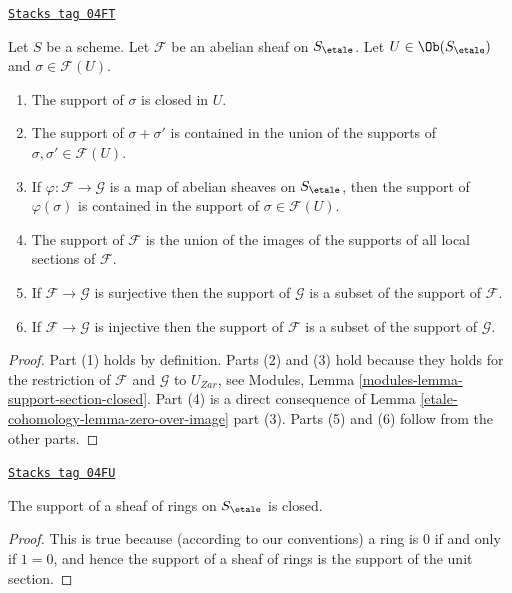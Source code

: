 \begin{lemma}
\label{etale-cohomology-lemma-support-section-closed}
\href{https://stacks.math.columbia.edu/tag/04FT}{\texttt{Stacks tag 04FT}}

Let $S$ be a scheme.
Let $\mathcal{F}$ be an abelian sheaf on $S_\etale$.
Let $U \in \Ob(S_\etale)$ and $\sigma \in \mathcal{F}(U)$.
\begin{enumerate}
\item The support of $\sigma$ is closed in $U$.
\item The support of $\sigma + \sigma'$ is contained in the union of
the supports of $\sigma, \sigma' \in \mathcal{F}(U)$.
\item If $\varphi : \mathcal{F} \to \mathcal{G}$ is a map of
abelian sheaves on $S_\etale$, then the support of $\varphi(\sigma)$
is contained in the support of $\sigma \in \mathcal{F}(U)$.
\item The support of $\mathcal{F}$ is the union of the images of the
supports of all local sections of $\mathcal{F}$.
\item If $\mathcal{F} \to \mathcal{G}$ is surjective then the support
of $\mathcal{G}$ is a subset of the support of $\mathcal{F}$.
\item If $\mathcal{F} \to \mathcal{G}$ is injective then the support
of $\mathcal{F}$ is a subset of the support of $\mathcal{G}$.
\end{enumerate}
\end{lemma}

\begin{proof}
Part (1) holds by definition.
Parts (2) and (3) hold because they holds for the restriction of
$\mathcal{F}$ and $\mathcal{G}$ to $U_{Zar}$, see
Modules, Lemma \ref{modules-lemma-support-section-closed}.
Part (4) is a direct consequence of
Lemma \ref{etale-cohomology-lemma-zero-over-image} part (3).
Parts (5) and (6) follow from the other parts.
\end{proof}

\begin{lemma}
\label{etale-cohomology-lemma-support-sheaf-rings-closed}
\href{https://stacks.math.columbia.edu/tag/04FU}{\texttt{Stacks tag 04FU}}

The support of a sheaf of rings on $S_\etale$ is closed.
\end{lemma}

\begin{proof}
This is true because (according to our conventions)
a ring is $0$ if and only if
$1 = 0$, and hence the support of a sheaf of rings
is the support of the unit section.
\end{proof}

